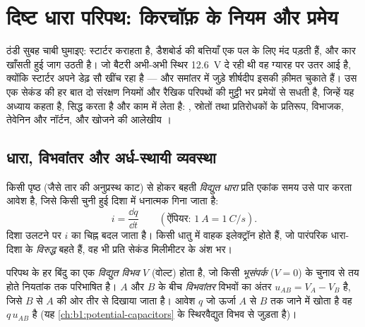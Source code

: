 \chapter{दिष्ट धारा परिपथ: किरचॉफ़ के नियम और प्रमेय}\label{ch:b1:dc-circuits}

ठंडी सुबह चाबी घुमाइए: स्टार्टर कराहता है, डैशबोर्ड की बत्तियाँ एक पल के लिए
मंद पड़ती हैं, और कार खाँसती हुई जाग उठती है। जो बैटरी अभी-अभी स्थिर
\qty{12.6}{V} दे रही थी वह ग्यारह पर उतर आई है, क्योंकि स्टार्टर अपने डेढ़ सौ
 खींच रहा है --- और समांतर में जुड़े शीर्षदीप इसकी क़ीमत चुकाते हैं। उस
एक सेकंड की हर बात दो संरक्षण नियमों और रैखिक परिपथों की मुट्ठी भर प्रमेयों से
सधती है, जिन्हें यह अध्याय कहता है, सिद्ध करता है और काम में लेता है: , स्रोतों तथा प्रतिरोधकों के प्रतिरूप, विभाजक, तेवेनिन और नॉर्टन, और
 खोजने की आलेखीय ।

\section{धारा, विभवांतर और अर्ध-स्थायी व्यवस्था}

\begin{definition}[विद्युत धारा]\label{def:b1:dc-circuits:current}
किसी पृष्ठ (जैसे तार की अनुप्रस्थ काट) से होकर बहती \emph{विद्युत धारा} प्रति
एकांक समय उसे पार करता आवेश है, जिसे किसी चुनी हुई दिशा में धनात्मक गिना जाता
है:
\[
i = \frac{\dd q}{\dd t} \qquad (\text{ऐंपियर: } \qty{1}{A} = \qty{1}{C/s}).
\]
दिशा उलटने पर $i$ का चिह्न बदल जाता है। किसी धातु में वाहक इलेक्ट्रॉन होते
हैं, जो पारंपरिक धारा-दिशा के \emph{विरुद्ध} बहते हैं, वह भी प्रति सेकंड
मिलीमीटर के अंश भर।
\end{definition}

\begin{definition}[विभव और विभवांतर]\label{def:b1:dc-circuits:voltage}
परिपथ के हर बिंदु का एक \emph{विद्युत विभव} $V$ (वोल्ट) होता है, जो किसी
\emph{भूसंपर्क} ($V = 0$) के चुनाव से तय होते नियतांक तक परिभाषित है।
$A$ और $B$ के बीच \emph{विभवांतर} विभवों का अंतर
$u_{AB} = V_A - V_B$ है, जिसे $B$ से $A$ की ओर तीर से दिखाया जाता है। आवेश
$q$ जो ऊर्जा $A$ से $B$ तक जाने में खोता है वह $q\,u_{AB}$ है (यह
\cref{ch:b1:potential-capacitors} के स्थिरवैद्युत विभव से जुड़ता है)।
\end{definition}

